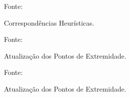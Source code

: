 \documentclass[xcolor=dvipsnames, aspectratio=169]{beamer}
\begin{document}
\begin{frame}
\begin{itemize}
      \begin{figure}
        \centering
        {Fonte: \cite{buniyamin2011simple}}
        \caption{Correspondências Heurísticas.}
        \label{fig:5}
      \end{figure}

      \begin{figure}
        \centering
        {Fonte: \cite{buniyamin2011simple}}
        \caption{Atualização dos Pontos de Extremidade.}
        \label{fig:6}
      \end{figure}
            
      \begin{figure}
        \centering
        {Fonte: \cite{buniyamin2011simple}}
        \caption{Atualização dos Pontos de Extremidade.}
        \label{fig:7}
      \end{figure}


\end{itemize}
\end{frame}
\end{document}
